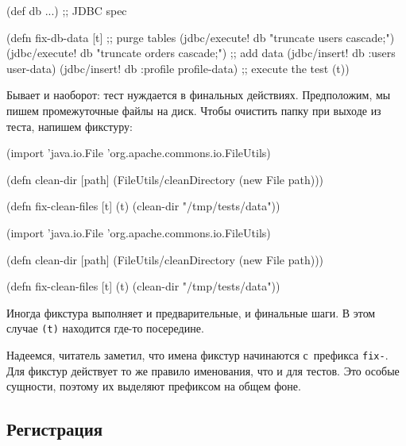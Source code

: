 \else

\begin{english}
  \begin{clojure}
(def db {...}) ;; JDBC spec

(defn fix-db-data [t]
  ;; purge tables
  (jdbc/execute! db "truncate users cascade;")
  (jdbc/execute! db "truncate orders cascade;")
  ;; add data
  (jdbc/insert! db :users user-data)
  (jdbc/insert! db :profile profile-data)
  ;; execute the test
  (t))
  \end{clojure}
\end{english}

\fi

Бывает и наоборот: тест нуждается в финальных действиях. Предположим, мы пишем
промежуточные файлы на диск. Чтобы очистить папку при выходе из теста, напишем
фикстуру:

\ifx\DEVICETYPE\MOBILE

\begin{english}
  \begin{clojure}
(import 'java.io.File
        'org.apache.commons.io.FileUtils)

(defn clean-dir [path]
  (FileUtils/cleanDirectory
    (new File path)))

(defn fix-clean-files [t]
  (t)
  (clean-dir "/tmp/tests/data"))
  \end{clojure}
\end{english}

\else

\begin{english}
  \begin{clojure}
(import 'java.io.File
        'org.apache.commons.io.FileUtils)

(defn clean-dir [path]
  (FileUtils/cleanDirectory (new File path)))

(defn fix-clean-files [t]
  (t)
  (clean-dir "/tmp/tests/data"))
  \end{clojure}
\end{english}

\fi

Иногда фикстура выполняет и предварительные, и финальные шаги. В этом случае
\verb|(t)| находится где-то посередине.

Надеемся, читатель заметил, что имена фикстур начинаются с~префикса
\verb|fix-|. Для фикстур действует то же правило именования, что и для
тестов. Это особые сущности, поэтому их выделяют префиксом на общем фоне.

\subsection{Регистрация}

